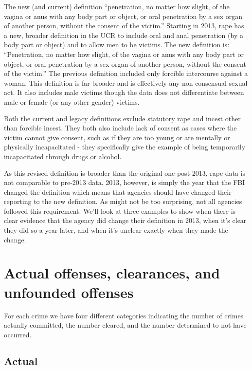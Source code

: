 \documentclass[
  12pt,
  openany]{book}
\begin{document}
The new (and current) definition ``penetration, no matter how slight, of the vagina or anus with any body part or object, or oral penetration by a sex organ of another person, without the consent of the victim.'' Starting in 2013, rape has a new, broader definition in the UCR to include oral and anal penetration (by a body part or object) and to allow men to be victims. The new definition is: ``Penetration, no matter how slight, of the vagina or anus with any body part or object, or oral penetration by a sex organ of another person, without the consent of the victim.'' The previous definition included only forcible intercourse against a woman. This definition is far broader and is effectively any non-consensual sexual act. It also includes male victims though the data does not differentiate between male or female (or any other gender) victims.

Both the current and legacy definitions exclude statutory rape and incest other than forcible incest. They both also include lack of consent as cases where the victim cannot give consent, such as if they are too young or are mentally or physically incapacitated - they specifically give the example of being temporarily incapacitated through drugs or alcohol.

As this revised definition is broader than the original one post-2013, rape data is not comparable to pre-2013 data. 2013, however, is simply the year that the FBI changed the definition which means that agencies should have changed their reporting to the new definition. As might not be too surprising, not all agencies followed this requirement. We'll look at three examples to show when there is clear evidence that the agency did change their definition in 2013, when it's clear they did so a year later, and when it's unclear exactly when they made the change.

\hypertarget{actual-offenses-clearances-and-unfounded-offenses}{%
\section{Actual offenses, clearances, and unfounded offenses}\label{actual-offenses-clearances-and-unfounded-offenses}}

For each crime we have four different categories indicating the number of crimes actually committed, the number cleared, and the number determined to not have occurred.

\hypertarget{actual}{%
\subsection{Actual}\label{actual}}
\end{document}
